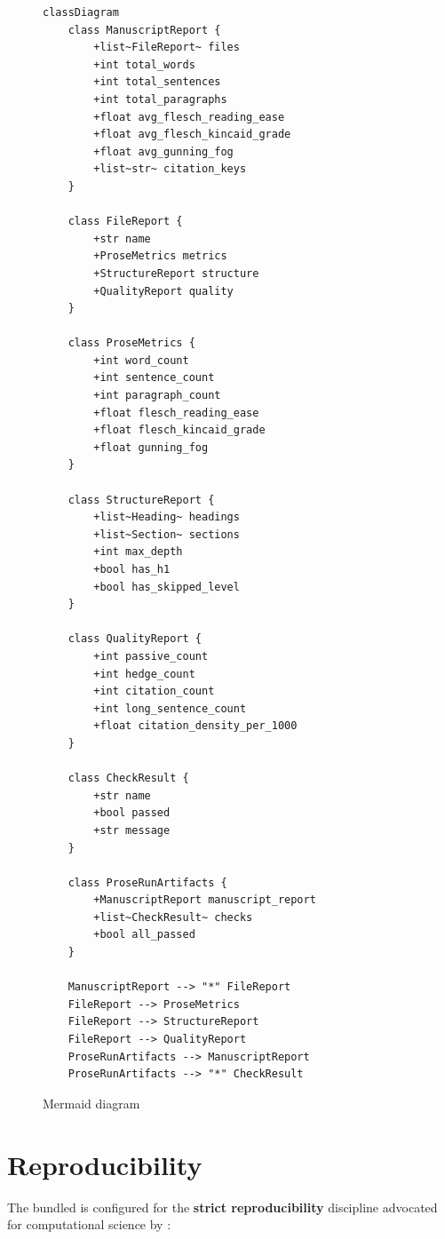 \documentclass[
]{article}
\begin{document}
\begin{figure}[htbp]
\centering
\begin{verbatim}
classDiagram
    class ManuscriptReport {
        +list~FileReport~ files
        +int total_words
        +int total_sentences
        +int total_paragraphs
        +float avg_flesch_reading_ease
        +float avg_flesch_kincaid_grade
        +float avg_gunning_fog
        +list~str~ citation_keys
    }

    class FileReport {
        +str name
        +ProseMetrics metrics
        +StructureReport structure
        +QualityReport quality
    }

    class ProseMetrics {
        +int word_count
        +int sentence_count
        +int paragraph_count
        +float flesch_reading_ease
        +float flesch_kincaid_grade
        +float gunning_fog
    }

    class StructureReport {
        +list~Heading~ headings
        +list~Section~ sections
        +int max_depth
        +bool has_h1
        +bool has_skipped_level
    }

    class QualityReport {
        +int passive_count
        +int hedge_count
        +int citation_count
        +int long_sentence_count
        +float citation_density_per_1000
    }

    class CheckResult {
        +str name
        +bool passed
        +str message
    }

    class ProseRunArtifacts {
        +ManuscriptReport manuscript_report
        +list~CheckResult~ checks
        +bool all_passed
    }

    ManuscriptReport --> "*" FileReport
    FileReport --> ProseMetrics
    FileReport --> StructureReport
    FileReport --> QualityReport
    ProseRunArtifacts --> ManuscriptReport
    ProseRunArtifacts --> "*" CheckResult
\end{verbatim}
\caption{Mermaid diagram}
\end{figure}

\newpage

\section{Reproducibility}\label{sec:reproducibility}

The bundled  is configured for the
\textbf{strict reproducibility} discipline advocated for computational
science by \citep{peng2011reproducible}:
\end{document}
